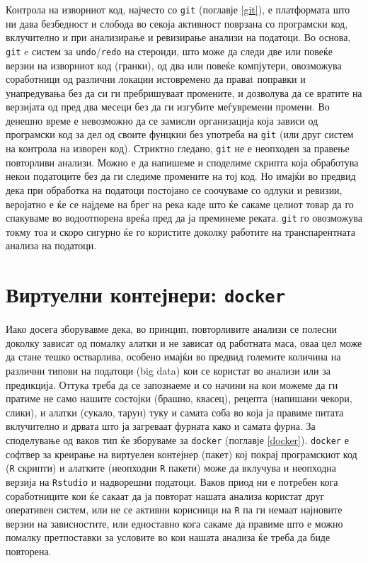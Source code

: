 \documentclass[
]{book}
\begin{document}
Контрола на изворниот код, најчесто со \texttt{git} (поглавје \ref{git}), е платформата што ни дава безбедност и слобода во секоја активност поврзана со програмски код, вклучително и при анализирање и ревизирање анализи на податоци. Во основа, \texttt{git} e систем за \texttt{undo}/\texttt{redo} на стероиди, што може да следи две или повеќе верзии на изворниот код (гранки), од два или повеќе компјутери, овозможува соработници од различни локации истовремено да праваt поправки и унапредувања без да си ги пребришуваат промените, и дозволува да се вратите на верзијата од пред два месеци без да ги изгубите меѓувремени промени. Во денешно време е невозможно да се замисли организација која зависи од програмски код за дел од своите фунцкии без употреба на \texttt{git} (или друг систем на контрола на изворен код). Стриктно гледано, \texttt{git} не е неопходен за правење повторливи анализи. Можно е да напишеме и споделиме скрипта која обработува некои податоците без да ги следиме промените на тој код. Но имајќи во предвид дека при обработка на податоци постојано се соочуваме со одлуки и ревизии, веројатно е ќе се најдеме на брег на река каде што ќе сакаме целиот товар да го спакуваме во водоотпорена вреќа пред да ја преминеме реката. \texttt{git} го овозможува токму тоа и скоро сигурно ќе го користите доколку работите на транспарентната анализа на податоци.

\hypertarget{ux432ux438ux440ux442ux443ux435ux43bux43dux438-ux43aux43eux43dux442ux435ux458ux43dux435ux440ux438-docker}{%
\section{\texorpdfstring{Виртуелни контејнери: \texttt{docker}}{Виртуелни контејнери: docker}}\label{ux432ux438ux440ux442ux443ux435ux43bux43dux438-ux43aux43eux43dux442ux435ux458ux43dux435ux440ux438-docker}}

Иако досега зборувавме дека, во принцип, повторливите анализи се полесни доколку зависат од помалку алатки и не зависат од работната маса, оваа цел може да стане тешко остварлива, особено имајќи во предвид големите количина на различни типови на податоци (big data) кои се користат во анализи или за предикција. Оттука треба да се запознаеме и со начини на кои можеме да ги пратиме не само нашите состојки (брашно, квасец), рецепта (напишани чекори, слики), и алатки (сукало, тарун) туку и самата соба во која ја правиме питата вклучително и дрвата што ја загреваат фурната како и самата фурна. За споделување од ваков тип ќе зборуваме за \texttt{docker} (поглавје \ref{docker}). \texttt{docker} е софтвер за креирање на виртуелен контејнер (пакет) кој покрај програмскиот код (\texttt{R} скрипти) и алатките (неопходни \texttt{R} пакети) може да вклучува и неопходна верзија на \texttt{Rstudio} и надворешни податоци. Ваков приод ни е потребен кога соработниците кои ќе сакаат да ја повторат нашата анализа користат друг оперативен систем, или не се активни корисници на \texttt{R} па ги немаат најновите верзии на зависностите, или едноставно кога сакаме да правиме што е можно помалку претпоставки за условите во кои нашата анализа ќе треба да биде повторена.
\end{document}

